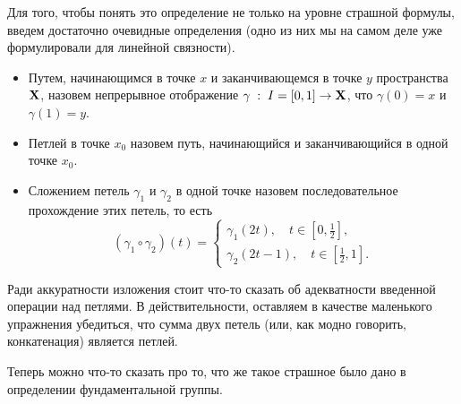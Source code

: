 Для того, чтобы понять это определение не только на уровне страшной формулы, введем достаточно очевидные определения (одно из них мы на самом деле уже формулировали для линейной связности).
\begin{Def}\mbox{}
    \begin{itemize}
        \item Путем, начинающимся в точке $x$ и заканчивающемся в точке $y$ пространства  $\mathbf{X}$, назовем непрерывное отображение $\gamma \; : \; I=[0,1] \to \mathbf{X}$, что $\gamma(0) = x$ и $\gamma(1) = y$.
        \item Петлей в точке $x_0$ назовем путь, начинающийся и заканчивающийся в одной точке $x_0$.
        \item Сложением петель $\gamma_1$ и $\gamma_2$ в одной точке назовем последовательное прохождение этих петель, то есть
            \[
                (\gamma_1 \circ \gamma_2) (t)= \begin{cases}
                \gamma_1(2t), \quad t \in [0, \frac{1}{2}],\\
                \gamma_2(2t-1), \quad t\in [\frac{1}{2}, 1].
            \end{cases}
            \] 
    \end{itemize}
\end{Def}

\begin{Task}
    Ради аккуратности изложения стоит что-то сказать об адекватности введенной операции над петлями. В действительности, оставляем в качестве маленького упражнения убедиться, что сумма двух петель (или, как модно говорить, конкатенация) является петлей.
\end{Task}

Теперь можно что-то сказать про то, что же такое страшное было дано в определении фундаментальной группы.

